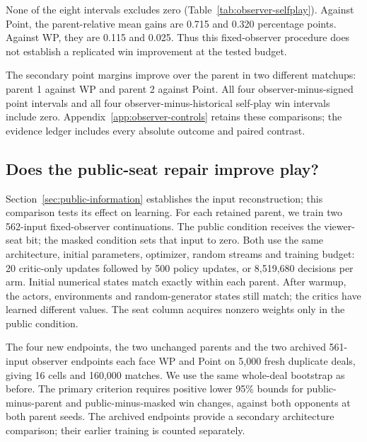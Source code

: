 \documentclass[11pt]{article}
\begin{document}
None of the eight intervals excludes zero (Table~\ref{tab:observer-selfplay}).
Against Point, the parent-relative mean gains are 0.715 and 0.320 percentage
points. Against WP, they are 0.115 and 0.025. Thus this fixed-observer procedure
does not establish a replicated win improvement at the tested budget.

\begin{table}[ht]
\centering\small

\caption{Fixed-observer self-play: primary paired win-score changes in
percentage points, with 95\% intervals, on 5,000 shared development deals.}
\label{tab:observer-selfplay}
\end{table}

The secondary point margins improve over the parent in two different
matchups: parent 1 against WP and parent 2 against Point. All four
observer-minus-signed point intervals and all four observer-minus-historical
self-play win intervals include zero. Appendix~\ref{app:observer-controls}
retains these comparisons; the evidence ledger includes every absolute
outcome and paired contrast.

\subsection{Does the public-seat repair improve play?}
\label{sec:seat-comparison}
Section~\ref{sec:public-information} establishes the input reconstruction;
this comparison tests its effect on learning.
For each retained parent, we train two 562-input fixed-observer continuations.
The public condition receives the viewer-seat bit; the masked condition sets
that input to zero. Both use the same architecture, initial parameters,
optimizer, random streams and training budget: 20 critic-only updates followed
by 500 policy updates, or 8,519,680 decisions per arm. Initial numerical states
match exactly within each parent. After warmup, the actors, environments and
random-generator states still match; the critics have learned different values.
The seat column acquires nonzero weights only in the public condition.

The four new endpoints, the two unchanged parents and the two archived
561-input observer endpoints each face WP and Point on 5,000 fresh duplicate
deals, giving 16 cells and 160,000 matches. We use the same whole-deal bootstrap
as before. The primary criterion requires positive lower 95\% bounds for
public-minus-parent and public-minus-masked win changes, against both opponents
at both parent seeds. The archived endpoints provide a secondary architecture
comparison; their earlier training is counted separately.
\end{document}
